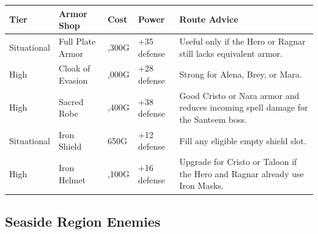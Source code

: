 \documentclass[
  american,
  10pt,
  letterpaper,
  oneside,
  open=any]{scrreprt}
\newcounter{none} %
\newenvironment{guidetable}{%
  \small\setstretch{1.0}%
  \setlength{\tabcolsep}{4pt}%
  \setlength{\LTpre}{8pt}\setlength{\LTpost}{10pt}%
  \renewcommand{\arraystretch}{1.16}%
}{ }
\begin{document}
\begin{guidetable}

{\def\LTcaptype{none} %
\begin{longtable}[]{@{}
  >{\raggedright\arraybackslash}p{}
  >{\raggedright\arraybackslash}p{}
  >{\raggedleft\arraybackslash}p{}
  >{\raggedleft\arraybackslash}p{}
  >{\raggedright\arraybackslash}p{}@{}}
\toprule\noalign{}
\begin{minipage}[b]{\linewidth}\raggedright
\color{GuideGreen}\bfseries Tier
\end{minipage} & \begin{minipage}[b]{\linewidth}\raggedright
\color{GuideGreen}\bfseries Armor Shop
\end{minipage} & \begin{minipage}[b]{\linewidth}\raggedleft
\color{GuideGreen}\bfseries Cost
\end{minipage} & \begin{minipage}[b]{\linewidth}\raggedleft
\color{GuideGreen}\bfseries Power
\end{minipage} & \begin{minipage}[b]{\linewidth}\raggedright
\color{GuideGreen}\bfseries Route Advice
\end{minipage} \\
\midrule\noalign{}
\endhead
\bottomrule\noalign{}
\endlastfoot
Situational & Full Plate Armor & 2,300G & +35 defense & Useful only if
the Hero or Ragnar still lacks equivalent armor. \\
High & Cloak of Evasion & 3,000G & +28 defense & Strong for Alena, Brey,
or Mara. \\
High & Sacred Robe & 4,400G & +38 defense & Good Cristo or Nara armor
and reduces incoming spell damage for the Santeem boss. \\
Situational & Iron Shield & 650G & +12 defense & Fill any eligible empty
shield slot. \\
High & Iron Helmet & 1,100G & +16 defense & Upgrade for Cristo or Taloon
if the Hero and Ragnar already use Iron Masks. \\
\end{longtable}
}

\end{guidetable}

\subsection{Seaside Region Enemies}\label{seaside-region-enemies}
\end{document}
